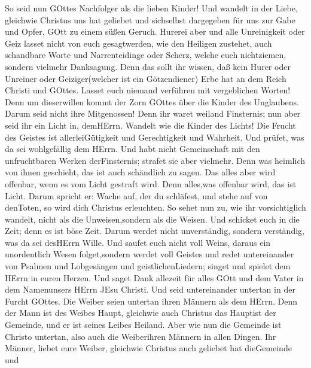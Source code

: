  So seid nun GOttes Nachfolger als die lieben Kinder!
 Und wandelt in der Liebe, gleichwie Christus uns hat
geliebet und sichselbst dargegeben für uns zur Gabe und Opfer, GOtt zu
einem süßen Geruch.  Hurerei aber und alle Unreinigkeit oder
Geiz lasset nicht von euch gesagtwerden, wie den Heiligen zustehet,
 auch schandbare Worte und Narrenteidinge oder Scherz,
welche euch nichtziemen, sondern vielmehr Danksagung.  Denn
das sollt ihr wissen, daß kein Hurer oder Unreiner oder Geiziger(welcher
ist ein Götzendiener) Erbe hat an dem Reich Christi und GOttes.
 Lasset euch niemand verführen mit vergeblichen Worten! Denn
um dieserwillen kommt der Zorn GOttes über die Kinder des Unglaubens.
 Darum seid nicht ihre Mitgenossen!  Denn ihr
waret weiland Finsternis; nun aber seid ihr ein Licht in, demHErrn.
 Wandelt wie die Kinder des Lichts! Die Frucht des Geistes
ist allerleiGütigkeit und Gerechtigkeit und Wahrheit.  Und
prüfet, was da sei wohlgefällig dem HErrn.  Und habt nicht
Gemeinschaft mit den unfruchtbaren Werken derFinsternis; strafet sie
aber vielmehr.  Denn was heimlich von ihnen geschieht, das
ist auch schändlich zu sagen.  Das alles aber wird
offenbar, wenn es vom Licht gestraft wird. Denn alles,was offenbar wird,
das ist Licht.  Darum spricht er: Wache auf, der du
schläfest, und stehe auf von denToten, so wird dich Christus erleuchten.
 So sehet nun zu, wie ihr vorsichtiglich wandelt, nicht als
die Unweisen,sondern als die Weisen.  Und schicket euch in
die Zeit; denn es ist böse Zeit.  Darum werdet nicht
unverständig, sondern verständig, was da sei desHErrn Wille.
 Und saufet euch nicht voll Weins, daraus ein unordentlich
Wesen folget,sondern werdet voll Geistes  und redet
untereinander von Psalmen und Lobgesängen und geistlichenLiedern; singet
und spielet dem HErrn in euren Herzen.  Und saget Dank
allezeit für alles GOtt und dem Vater in dem Namenunsers HErrn JEsu
Christi.  Und seid untereinander untertan in der Furcht
GOttes.  Die Weiber seien untertan ihren Männern als dem
HErrn.  Denn der Mann ist des Weibes Haupt, gleichwie auch
Christus das Hauptist der Gemeinde, und er ist seines Leibes Heiland.
 Aber wie nun die Gemeinde ist Christo untertan, also auch
die Weiberihren Männern in allen Dingen.  Ihr Männer,
liebet eure Weiber, gleichwie Christus auch geliebet hat dieGemeinde und
